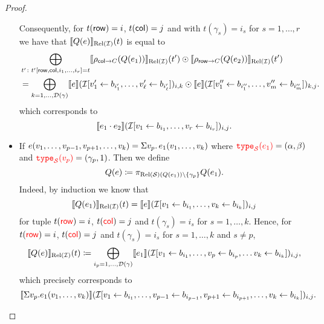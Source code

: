 \begin{proof}
\begin{itemize}
{		Consequently, for $t(\mathsf{row})=i$, $t(\mathsf{col})=j$ and with $t(\gamma_s)=i_s$ for $s=1,\ldots, r$ we have
		that $\llbracket Q(e) \rrbracket_{\text{Rel}(\mathcal{I})}(t)$ is equal to
		\begin{align*}
			&\bigoplus_{t'\colon t'[\mathsf{row},\mathsf{col},i_1,\ldots,i_r]=t} \llbracket \rho_{\mathsf{col}\to C}(Q (e_1)) \rrbracket_{\text{Rel}(\mathcal{I})}(t')\odot \llbracket \rho_{\mathsf{row}\to C}(Q (e_2)) \rrbracket_{\text{Rel}(\mathcal{I})}(t') \\
			&=\bigoplus_{k=1,\ldots,\mathcal{D}(\gamma)} \llbracket e \rrbracket(\mathcal{I}[v_1'\gets b_{i'_1},\ldots,v_\ell'\gets b_{i'_\ell}])_{i,k}\odot \llbracket e \rrbracket(\mathcal{I}[v_1''\gets b_{i''_1},\ldots,v_m''\gets b_{i''_m}])_{k,j}.
		\end{align*}
		which corresponds to 
		$$
		\llbracket e_1\cdot e_2 \rrbracket(\mathcal{I}[v_1\gets b_{i_1},\ldots,v_r\gets b_{i_r}])_{i,j}.
		$$
		}
  \item If $e(v_1,\ldots,v_{p-1},v_{p+1},\ldots,v_k)=\Sigma v_p. \, e_1(v_1,\ldots,v_k)$ where ${\color{red} \texttt{type}_{\mathcal{S}}(e_1)}=(\alpha,\beta)$ and ${\color{red} \texttt{type}_{\mathcal{S}}(v_p)}=(\gamma_p,1)$. Then we define
		$$
		Q (e)\coloneqq \pi_{\text{Rel}(\mathcal{S})(Q(e_1))\setminus\{\gamma_p\}} Q (e_1).
		$$
		Indeed, by induction we know that 
		$$
		\llbracket Q(e_1) \rrbracket_{\text{Rel}(\mathcal{I})}(t)=\llbracket e \rrbracket(\mathcal{I}[v_1\gets b_{i_1},\ldots,v_k\gets b_{i_k}])_{i,j}
		$$
		for tuple $t({\color{red} \mathsf{row}})=i$, $t({\color{red} \mathsf{col}})=j$ and $t(\gamma_s)=i_s$ for $s=1,\ldots, k$.
		Hence, for $t({\color{red} \mathsf{row}})=i$, $t({\color{red} \mathsf{col}})=j$ and $t(\gamma_s)=i_s$ for $s=1,\ldots, k$ and $s\neq p$,
		$$
		\llbracket Q(e) \rrbracket_{\text{Rel}(\mathcal{I})}(t)\coloneqq \bigoplus_{i_p=1,\ldots,\mathcal{D}(\gamma)} \llbracket e_1 \rrbracket(\mathcal{I}[v_1\gets b_{i_1},\ldots,v_{p}\gets b_{i_p},\ldots v_k\gets b_{i_k}])_{i,j},$$
		which precisely corresponds to 
		$$
		\llbracket \Sigma v_p. e_1(v_1,\ldots,v_k) \rrbracket(\mathcal{I}[v_1\gets b_{i_1},\ldots,v_{p-1}\gets b_{i_{p-1}},v_{p+1}\gets b_{i_{p+1}},\ldots,v_k\gets b_{i_k}])_{i,j}.
		$$

\end{itemize}
\end{proof}
